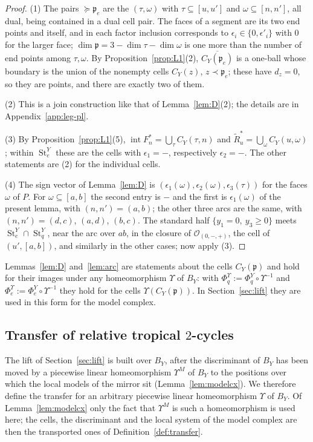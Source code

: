 \begin{proof}
(1) The pairs $\succeq {\mathfrak p}_e$ are the $(\tau,\omega)$ with $\tau\subseteq[u,u']$ and $\omega\subseteq[n,n']$, all dual, being
contained in a dual cell pair. The faces of a segment are its two end points and itself, and in each factor inclusion
corresponds to $\epsilon_i\in\{0,\epsilon'_i\}$ with $0$ for the larger face; $\dim{\mathfrak p}=3-\dim\tau-\dim\omega$ is one more than
the number of end points among $\tau,\omega$. By Proposition~\ref{prop:L1}(2), $\overline{C_Y({\mathfrak p}_e)}$ is a one-ball whose
boundary is the union of the nonempty cells $C_Y(z)$, $z\prec {\mathfrak p}_e$; these have $d_z=0$, so they are points, and there are
exactly two of them.

(2) This is a join construction like that of Lemma~\ref{lem:D}(2); the details are in
Appendix~\ref{app:leg-pl}.

(3) By Proposition~\ref{prop:L1}(5), $\operatorname{int}F^*_n=\bigcup_\tau C_Y(\tau,n)$ and $\widetilde
R^*_u=\bigcup_\omega C_Y(u,\omega)$; within $\operatorname{St}^Y_e$ these are the cells with $\epsilon_1=-$, respectively
$\epsilon_2=-$. The other statements are (2) for the individual cells.

(4) The sign vector of Lemma~\ref{lem:D} is $(\epsilon_1(\omega),\epsilon_2(\omega),\epsilon_3(\tau))$ for the faces
$\omega$ of $P$. For $\omega\subseteq[a,b]$ the second entry is $-$ and the first is $\epsilon_1(\omega)$ of the present
lemma, with $(n,n')=(a,b)$; the other three arcs are the same, with $(n,n')=(d,c)$, $(a,d)$, $(b,c)$. The standard half
$\{y_1=0,\ y_3\ge0\}$ meets $\operatorname{St}^Y_e\cap\operatorname{St}^Y_q$, near the arc over $ab$, in the closure of
$\mathcal O_{(0,-,+)}$, the cell of $(u',[a,b])$, and similarly in the other cases; now apply (3).
\end{proof}

Lemmas~\ref{lem:D} and~\ref{lem:arc} are statements about the cells $C_Y({\mathfrak p})$ and hold for their images under any
homeomorphism $\Upsilon$ of $B_Y$: with $\Phi^\Upsilon_q:=\Phi^Y_q\circ\Upsilon^{-1}$ and
$\Phi^\Upsilon_e:=\Phi^Y_e\circ\Upsilon^{-1}$ they hold for the cells $\Upsilon(C_Y({\mathfrak p}))$. In Section~\ref{sec:lift} they are
used in this form for the model complex.

\subsection{Transfer of relative tropical \texorpdfstring{$2$}{2}-cycles}\label{ssec:leg-transfer}
The lift of Section~\ref{sec:lift} is built over $B_Y$, after the discriminant of $B_Y$ has been moved by a piecewise linear
homeomorphism $\Upsilon^M$ of $B_Y$ to the positions over which the local models of the mirror sit
(Lemma~\ref{lem:modelcx}). We therefore define the transfer for an arbitrary piecewise linear homeomorphism $\Upsilon$ of
$B_Y$. Of Lemma~\ref{lem:modelcx} only the fact that $\Upsilon^M$ is such a homeomorphism is used here; the cells, the
discriminant and the local system of the model complex are then the transported ones of Definition~\ref{def:transfer}.

